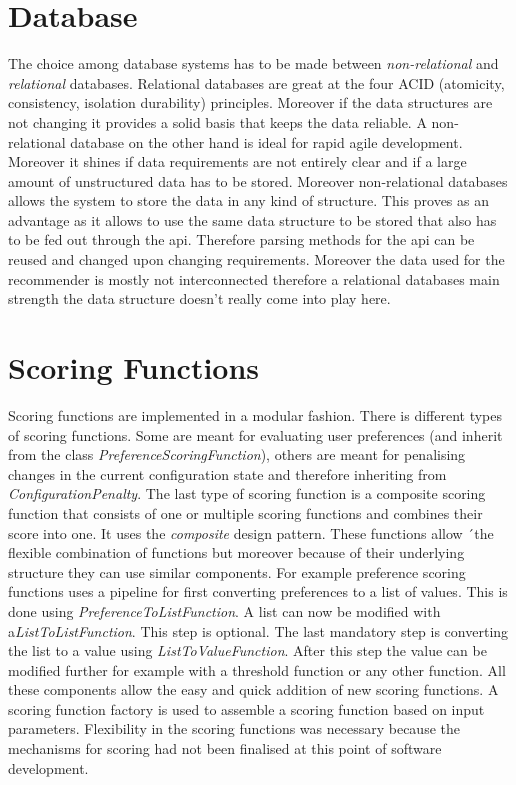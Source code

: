 \section{Database}
\label{sec:DesignImplementation:Database}

The choice among database systems has to be made between \emph{non-relational} and \emph{relational} databases. Relational databases are great at the four ACID (atomicity, consistency, isolation durability) principles. Moreover if the data structures are not changing it provides a solid basis that keeps the data reliable. A non-relational database on the other hand is ideal for rapid agile development. Moreover it shines if data requirements are not entirely clear and if a large amount of unstructured  data has to be stored. Moreover non-relational databases allows the system to store the data in any kind of structure. This proves as an advantage as it allows to use the same data structure to be stored that also has to be fed out through the api. Therefore parsing methods for the api can be reused and changed upon changing requirements. Moreover the data used for the recommender is mostly not interconnected therefore a relational databases main strength the data structure doesn't really come into play here.

\section{Scoring Functions}
\label{sec:DesignImplementation:ScroingFunctions}

Scoring functions are implemented in a modular fashion. There is different types of scoring functions. Some are meant for evaluating user preferences (and inherit from the class \emph{PreferenceScoringFunction}), others are meant for penalising changes in the current configuration state and therefore inheriting from  \emph{ConfigurationPenalty}. The last type of scoring function is a composite scoring function that consists of one or multiple scoring functions and combines their score into one. It uses the \emph{composite} design pattern. These functions allow ´the flexible combination of functions but moreover because of their underlying structure they can use similar components. For example preference scoring functions uses a pipeline for first converting preferences to a list of values. This is done using \emph{PreferenceToListFunction}. A list can now be modified with a\emph{ListToListFunction}. This step is optional. The last mandatory step is converting the list to a value using \emph{ListToValueFunction}. After this step the value can be modified further for example with a threshold function or any other function. All these components allow the easy and quick addition of new scoring functions. A scoring function factory is used to assemble a scoring function based on input parameters. Flexibility in the scoring functions was necessary because the mechanisms for scoring had not been finalised at this point of software development.


